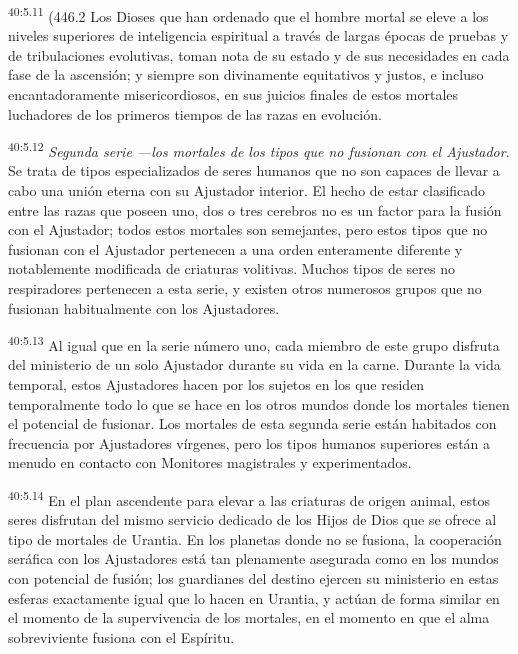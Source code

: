 \par
\textsuperscript{40:5.11} (446.2 Los Dioses que han ordenado que el hombre mortal se eleve a los niveles superiores de inteligencia espiritual a través de largas épocas de pruebas y de tribulaciones evolutivas, toman nota de su estado y de sus necesidades en cada fase de la ascensión; y siempre son divinamente equitativos y justos, e incluso encantadoramente misericordiosos, en sus juicios finales de estos mortales luchadores de los primeros tiempos de las razas en evolución.

\par
\textsuperscript{40:5.12} \textit{Segunda serie ---los mortales de los tipos que no fusionan con el Ajustador}. Se trata de tipos especializados de seres humanos que no son capaces de llevar a cabo una unión eterna con su Ajustador interior. El hecho de estar clasificado entre las razas que poseen uno, dos o tres cerebros no es un factor para la fusión con el Ajustador; todos estos mortales son semejantes, pero estos tipos que no fusionan con el Ajustador pertenecen a una orden enteramente diferente y notablemente modificada de criaturas volitivas. Muchos tipos de seres no respiradores pertenecen a esta serie, y existen otros numerosos grupos que no fusionan habitualmente con los Ajustadores.

\par
\textsuperscript{40:5.13} Al igual que en la serie número uno, cada miembro de este grupo disfruta del ministerio de un solo Ajustador durante su vida en la carne. Durante la vida temporal, estos Ajustadores hacen por los sujetos en los que residen temporalmente todo lo que se hace en los otros mundos donde los mortales tienen el potencial de fusionar. Los mortales de esta segunda serie están habitados con frecuencia por Ajustadores vírgenes, pero los tipos humanos superiores están a menudo en contacto con Monitores magistrales y experimentados.

\par
\textsuperscript{40:5.14} En el plan ascendente para elevar a las criaturas de origen animal, estos seres disfrutan del mismo servicio dedicado de los Hijos de Dios que se ofrece al tipo de mortales de Urantia. En los planetas donde no se fusiona, la cooperación seráfica con los Ajustadores está tan plenamente asegurada como en los mundos con potencial de fusión; los guardianes del destino ejercen su ministerio en estas esferas exactamente igual que lo hacen en Urantia, y actúan de forma similar en el momento de la supervivencia de los mortales, en el momento en que el alma sobreviviente fusiona con el Espíritu.

